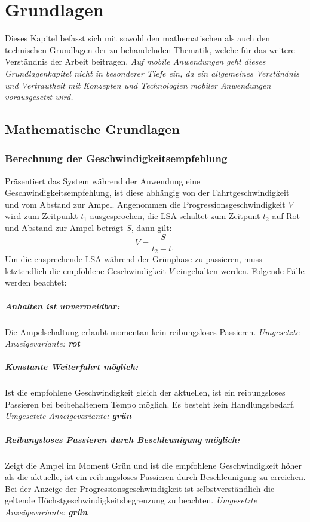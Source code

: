 \chapter{Grundlagen}
Dieses Kapitel befasst sich mit sowohl den mathematischen als auch den technischen Grundlagen der zu behandelnden Thematik, welche für das weitere Verständnis der Arbeit beitragen. \textit{Auf mobile Anwendungen geht dieses Grundlagenkapitel nicht in besonderer Tiefe ein, da ein allgemeines Verständnis und Vertrautheit mit Konzepten und Technologien mobiler Anwendungen vorausgesetzt wird.}
\section{Mathematische Grundlagen}
\subsection*{Berechnung der Geschwindigkeitsempfehlung}
Präsentiert das System während der Anwendung eine Geschwindigkeitsempfehlung, ist diese abhängig von der Fahrtgeschwindigkeit und vom Abstand zur Ampel. Angenommen die Progressionsgeschwindigkeit $V$ wird zum Zeitpunkt $t_{1}$ ausgesprochen, die \gls {LSA} schaltet zum Zeitpunt $t_{2}$ auf Rot und Abstand zur Ampel beträgt $S$, dann gilt: 
\[ V = \frac{S}{t_{2} - t_{1}} \]
Um die ensprechende \gls{LSA} während der Grünphase zu passieren, muss letztendlich die empfohlene Geschwindigkeit $V$ eingehalten werden. Folgende Fälle werden beachtet:
\paragraph{Anhalten ist unvermeidbar:} Die Ampelschaltung erlaubt momentan kein reibungsloses Passieren. 
\textit{Umgesetzte Anzeigevariante: \textbf{rot}}
\paragraph{Konstante Weiterfahrt möglich:} Ist die empfohlene Geschwindigkeit gleich der aktuellen, ist ein reibungsloses Passieren bei beibehaltenem Tempo möglich. Es besteht kein Handlungsbedarf. 
\textit{Umgesetzte Anzeigevariante: \textbf{grün}}
\paragraph{Reibungsloses Passieren durch Beschleunigung möglich:} Zeigt die Ampel im Moment Grün und ist die empfohlene Geschwindigkeit höher als die aktuelle, ist ein reibungsloses Passieren durch Beschleunigung zu erreichen. Bei der Anzeige der Progressionsgeschwindigkeit ist selbstverständlich die geltende Höchstgeschwindigkeitsbegrenzung zu beachten. 
\textit{Umgesetzte Anzeigevariante: \textbf{grün}}
